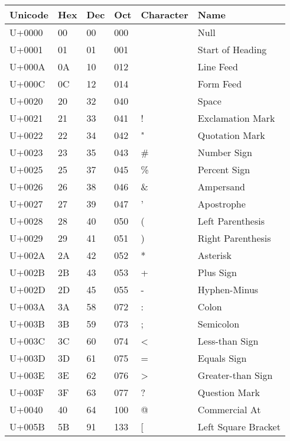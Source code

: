 \begin{table}
  \centering
    \begin{tabular}{| l | l | l | l | l | l |}
    \hline
    Unicode & Hex & Dec & Oct & Character & Name  \\ \hline
    U+0000  & 00  & 00  & 000 & 	  & Null \\ \hline	
    U+0001  & 01  & 01  & 001 & 	  & Start of Heading \\ \hline	
    U+000A  & 0A  & 10  & 012 & 	  & Line Feed \\ \hline	
    U+000C  & 0C  & 12  & 014 & 	  & Form Feed \\ \hline
    U+0020  & 20  & 32  & 040 & 	  & Space \\ \hline
    U+0021  & 21  & 33  & 041 & !	  & Exclamation Mark \\ \hline
    U+0022  & 22  & 34  & 042 & "	  & Quotation Mark \\ \hline
    U+0023  & 23  & 35  & 043 & \#	  & Number Sign \\ \hline
    U+0025  & 25  & 37  & 045 & \%	  & Percent Sign \\ \hline
    U+0026  & 26  & 38  & 046 & \&	  & Ampersand \\ \hline
    U+0027  & 27  & 39  & 047 & '	  & Apostrophe \\ \hline
    U+0028  & 28  & 40  & 050 & (	  & Left Parenthesis \\ \hline
    U+0029  & 29  & 41  & 051 & )	  & Right Parenthesis \\ \hline
    U+002A  & 2A  & 42  & 052 & *	  & Asterisk \\ \hline
    U+002B  & 2B  & 43  & 053 & +	  & Plus Sign \\ \hline	
    U+002D  & 2D  & 45  & 055 & -	  & Hyphen-Minus \\ \hline
    U+003A  & 3A  & 58  & 072 & :	  & Colon \\ \hline
    U+003B  & 3B  & 59  & 073 & ;	  & Semicolon \\ \hline
    U+003C  & 3C  & 60  & 074 & <	  & Less-than Sign \\ \hline
    U+003D  & 3D  & 61  & 075 & =	  & Equals Sign	 \\ \hline	
    U+003E  & 3E  & 62  & 076 & >	  & Greater-than Sign \\ \hline
    U+003F  & 3F  & 63  & 077 & ?	  & Question Mark \\ \hline	
    U+0040  & 40  & 64  & 100 & @	  & Commercial At \\ \hline	
    U+005B  & 5B  & 91  & 133 & [	  & Left Square Bracket \\ \hline	

\end{tabular}
\end{table}
